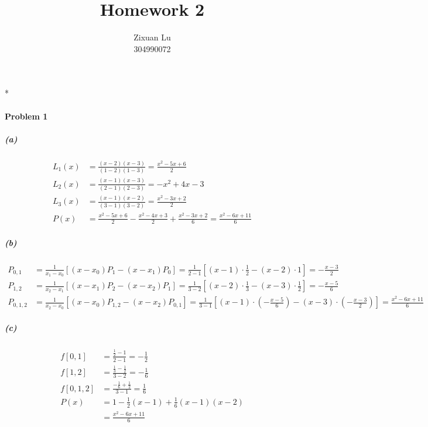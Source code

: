 *\documentclass{article}
\author{Zixuan Lu \\ 304990072}
\title{\textbf{Homework 2}}
\begin{document}
\maketitle
\paragraph{Problem 1}
\subparagraph*{(a)} 
\begin{equation}\nonumber
\begin{split}
L_1(x)&=\frac{(x-2)(x-3)}{(1-2)(1-3)} = \frac{x^2-5x+6}{2} \\
L_2(x)&=\frac{(x-1)(x-3)}{(2-1)(2-3)} = -x^2+4x-3 \\
L_3(x)&=\frac{(x-1)(x-2)}{(3-1)(3-2)} = \frac{x^2-3x+2}{2} \\
P(x)&=\frac{x^2-5x+6}{2}-\frac{x^2-4x+3}{2}+\frac{x^2-3x+2}{6} = \frac{x^2-6x+11}{6}
\end{split}
\end{equation}
\subparagraph*{(b)} 
\begin{equation}\nonumber
\begin{split}
P_{0,1} &= \frac{1}{x_1-x_0}[(x-x_0)P_1-(x-x_1)P_0] = \frac{1}{2-1}[(x-1)\cdot\frac{1}{2}-(x-2)\cdot1] = -\frac{x-3}{2} \\
P_{1,2} &= \frac{1}{x_2-x_1}[(x-x_1)P_2-(x-x_2)P_1] = \frac{1}{3-2}[(x-2)\cdot\frac{1}{3}-(x-3)\cdot\frac{1}{2}] = -\frac{x-5}{6} \\
P_{0,1,2} &= \frac{1}{x_2-x_0}[(x-x_0)P_{1,2}-(x-x_2)P_{0,1}]= \frac{1}{3-1}[(x-1)\cdot(-\frac{x-5}{6})-(x-3)\cdot( -\frac{x-3}{2})] = \frac{x^2-6x+11}{6}
\end{split}
\end{equation}
\subparagraph*{(c)}
\begin{equation}\nonumber
\begin{split}
f[0,1] &= \frac{\frac{1}{2}-1}{2-1} = -\frac{1}{2} \\
f[1,2] &= \frac{\frac{1}{3}-\frac{1}{2}}{3-2} = -\frac{1}{6} \\
f[0,1,2] &= \frac{-\frac{1}{6}+\frac{1}{2}}{3-1} = \frac{1}{6} \\
P(x) &= 1 - \frac{1}{2}(x-1) + \frac{1}{6}(x-1)(x-2) \\
&= \frac{x^2-6x+11}{6}
\end{split}
\end{equation}

\newpage
\end{document}
